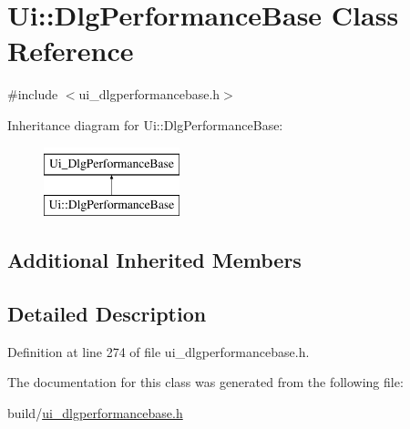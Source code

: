 \hypertarget{classUi_1_1DlgPerformanceBase}{\section{Ui\+:\+:Dlg\+Performance\+Base Class Reference}
\label{classUi_1_1DlgPerformanceBase}
}


{\ttfamily \#include $<$ui\+\_\+dlgperformancebase.\+h$>$}

Inheritance diagram for Ui\+:\+:Dlg\+Performance\+Base\+:\begin{figure}[H]
\begin{center}
\leavevmode
\includegraphics[height=2.000000cm]{classUi_1_1DlgPerformanceBase}
\end{center}
\end{figure}
\subsection*{Additional Inherited Members}


\subsection{Detailed Description}


Definition at line 274 of file ui\+\_\+dlgperformancebase.\+h.



The documentation for this class was generated from the following file\+:\begin{DoxyCompactItemize}
\item 
build/\hyperlink{ui__dlgperformancebase_8h}{ui\+\_\+dlgperformancebase.\+h}\end{DoxyCompactItemize}
